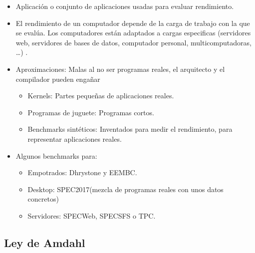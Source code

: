 \documentclass[12pt, twoside, openright]{report} %
\begin{document}
  \begin{itemize}
  
  \item
    Aplicación o conjunto de aplicaciones usadas para evaluar
    rendimiento.
  \item
    El rendimiento de un computador depende de la carga de trabajo con
    la que se evalúa. Los computadores están adaptados a cargas
    especificas (servidores web, servidores de bases de datos,
    computador personal, multicomputadoras, \ldots) .
  \item
    Aproximaciones: Malas al no ser programas reales, el arquitecto y el
    compilador pueden engañar

    \begin{itemize}
    
    \item
      Kernels: Partes pequeñas de aplicaciones reales.
    \item
      Programas de juguete: Programas cortos.
    \item
      Benchmarks sintéticos: Inventados para medir el rendimiento, para
      representar aplicaciones reales.
    \end{itemize}
  \item
    Algunos benchmarks para:

    \begin{itemize}
    
    \item
      Empotrados: Dhrystone y EEMBC.
    \item
      Desktop: SPEC2017(mezcla de programas reales con unos datos
      concretos)
    \item
      Servidores: SPECWeb, SPECSFS o TPC.
    \end{itemize}
  \end{itemize}

  \subsection{Ley de Amdahl}
\end{document}

